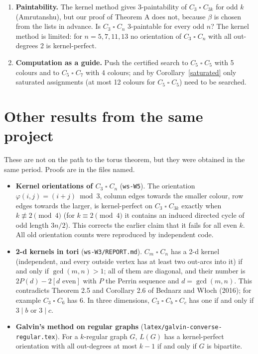 \documentclass[11pt]{article}
\theoremstyle{plain}
\theoremstyle{definition}
\theoremstyle{remark}
\newcommand{\T}{\mathbin{\square}}
\newcommand{\script}[1]{\texttt{#1}}
\begin{document}
\begin{enumerate}[itemsep=0.35em]
\item \textbf{Paintability.} The kernel method gives 3-paintability of $C_3 \T C_{3k}$ for odd $k$ (Amrutanshu), but our proof
of Theorem A does not, because $\beta$ is chosen from the lists in advance. Is $C_3 \T C_n$ 3-paintable for every odd $n$? The
kernel method is limited: for $n = 5, 7, 11, 13$ no orientation of $C_3 \T C_n$ with all out-degrees 2 is kernel-perfect.

\item \textbf{Computation as a guide.} Push the certified search to $C_5 \T C_5$ with 5 colours and to $C_5 \T C_7$ with
4 colours; and by Corollary~\ref{saturated} only saturated assignments (at most 12 colours for $C_5 \T C_5$) need to be searched.
\end{enumerate}

\section{Other results from the same project}\label{sec:other}

These are not on the path to the torus theorem, but they were obtained in the same period. Proofs are in the files named.

\begin{itemize}[itemsep=0.3em]
\item \textbf{Kernel orientations of $C_3 \T C_n$} (\script{ws-W5}). The orientation $\varphi(i,j) = (i + j) \bmod 3$, column edges
towards the smaller colour, row edges towards the larger, is kernel-perfect on $C_3 \T C_{3k}$ exactly when
$k \not\equiv 2 \pmod 4$ (for $k \equiv 2 \pmod 4$ it contains an induced directed cycle of odd length $3n/2$). This corrects the
earlier claim that it fails for all even $k$. All old orientation counts were reproduced by independent code.
\item \textbf{2-d kernels in tori} (\script{ws-W3/REPORT.md}). $C_m \T C_n$ has a 2-d kernel (independent, and every outside
vertex has at least two out-arcs into it) if and only if $\gcd(m, n) > 1$; all of them are diagonal, and their number is
$2P(d) - 2[d \text{ even}]$ with $P$ the Perrin sequence and $d = \gcd(m,n)$. This contradicts Theorem 2.5 and Corollary 2.6
of Bednarz and W{\l}och (2016); for example $C_3 \T C_6$ has 6. In three dimensions, $C_3 \T C_b \T C_c$ has one if and only if
$3 \mid b$ or $3 \mid c$.
\item \textbf{Galvin's method on regular graphs} (\script{latex/galvin-converse-regular.tex}). For a $k$-regular graph $G$, $L(G)$
has a kernel-perfect orientation with all out-degrees at most $k - 1$ if and only if $G$ is bipartite.
\end{itemize}
\end{document}
